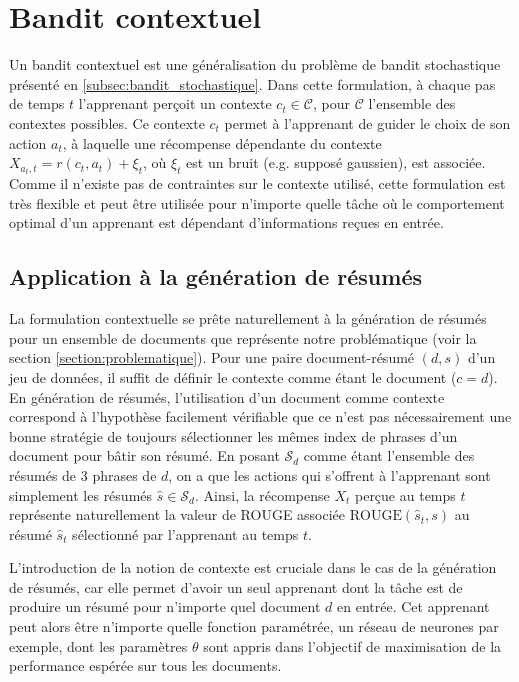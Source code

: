 \section{Bandit contextuel}

Un bandit contextuel est une généralisation 
du problème de bandit stochastique présenté en \ref{subsec:bandit_stochastique}.
Dans cette formulation, à chaque pas de temps $t$ l'apprenant perçoit un 
contexte $c_t \in \mathcal{C}$, pour $\mathcal{C}$ l'ensemble des contextes possibles.
Ce contexte $c_t$ permet à l'apprenant de guider le choix de son action $a_t$,
à laquelle une récompense dépendante du contexte $X_{a_t,t} = r(c_t, a_t) + \xi_t$,
où $\xi_t$ est un bruit (e.g. supposé gaussien), est associée.
Comme il n'existe pas de contraintes sur le contexte utilisé, cette
formulation est très flexible et peut être utilisée pour n'importe quelle
tâche où le comportement optimal d'un apprenant est dépendant d'informations 
reçues en entrée.

\subsection{Application à la génération de résumés}
\label{subsec:context_gen_res}

La formulation contextuelle se prête naturellement à la génération 
de résumés pour un ensemble de documents que représente notre problématique (voir la section
 \ref{section:problematique}).
Pour une paire document-résumé $(d, s)$ d'un jeu de données, il suffit de définir le contexte
comme étant le document ($c=d$).
En génération de résumés, l'utilisation d'un document comme contexte correspond à l'hypothèse
facilement vérifiable que ce n'est pas nécessairement une bonne stratégie de 
toujours sélectionner les mêmes index de phrases d'un document pour bâtir son résumé.
En posant $\mathcal{S}_d$ comme étant l'ensemble des résumés
de 3 phrases de $d$, on a que les actions qui s'offrent à l'apprenant 
sont simplement les résumés $\hat{s} \in \mathcal{S}_d$.
Ainsi, la récompense $X_t$ per­çue au temps $t$ représente naturellement la valeur de
ROUGE associée $\text{ROUGE}(\hat{s}_t, s)$ au résumé $\hat{s}_t$ sélectionné
par l'apprenant au temps $t$.

L'introduction de la notion de contexte est 
cruciale dans le cas de la génération de résumés, 
car elle permet d'avoir un seul apprenant dont la 
tâche est de produire un résumé pour n'importe quel document $d$ en entrée.
Cet apprenant peut alors être n'importe quelle fonction paramétrée, 
un réseau de neurones par exemple, dont les paramètres $\theta$ 
sont appris dans l'objectif de maximisation de la performance
espérée sur tous les documents.

